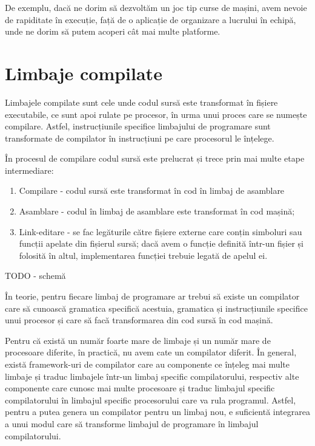 De exemplu, dacă ne dorim să dezvoltăm un joc tip curse de mașini, avem nevoie
de rapiditate în execuție, față de o aplicație de organizare a lucrului în
echipă, unde ne dorim să putem acoperi cât mai multe platforme.

\section{Limbaje compilate}
\label{sec:appdev-langs-comp}

Limbajele compilate sunt cele unde codul sursă este transformat în fișiere
executabile, ce sunt apoi rulate pe procesor, în urma unui proces care se
numește compilare. Astfel, instrucțiunile specifice limbajului de programare
sunt transformate de compilator în instrucțiuni pe care procesorul le înțelege.

În procesul de compilare codul sursă este prelucrat și trece prin mai multe
etape intermediare:

\begin{enumerate}
	\item Compilare - codul sursă este transformat în cod în limbaj de
		asamblare
	\item Asamblare - codul în limbaj de asamblare este transformat în cod
		mașină;
	\item Link-editare - se fac legăturile către fișiere externe care conțin
		simboluri sau funcții apelate din fișierul sursă; dacă avem o
		funcție definită într-un fișier și folosită în altul,
		implementarea funcției trebuie legată de apelul ei.
\end{enumerate}

TODO - schemă

În teorie, pentru fiecare limbaj de programare ar trebui să existe un compilator
care să cunoască gramatica specifică acestuia, gramatica și instrucțiunile
specifice unui procesor și care să facă transformarea din cod sursă în cod
mașină.

Pentru că există un număr foarte mare de limbaje și un număr mare de procesoare
diferite, în practică, nu avem cate un compilator diferit. În general, există
framework-uri de compilator care au componente ce înțeleg mai multe limbaje și
traduc limbajele într-un limbaj specific compilatorului, respectiv alte
componente care cunosc mai multe procesoare și traduc limbajul specific
compilatorului în limbajul specific procesorului care va rula programul. Astfel,
pentru a putea genera un compilator pentru un limbaj nou, e suficientă
integrarea a unui modul care să transforme limbajul de programare în limbajul
compilatorului.


